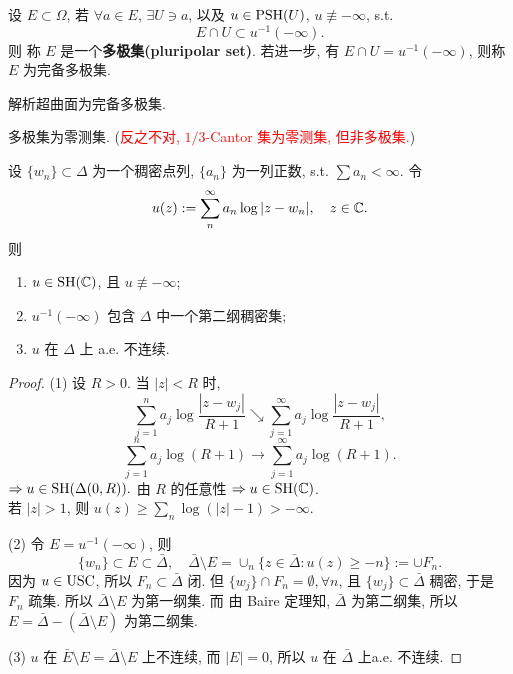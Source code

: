 \begin{definition}
  设 $E \subset \Omega $, 若 $\forall a \in E$, $\exists U \ni a$, 以及 $u \in \operatorname{PSH}(U)$, $u \not \equiv - \infty $, s.t. 
  $$ E \cap U \subset  u^{-1}(-\infty ).$$
  则 称 $E$ 是一个\textbf{多极集(pluripolar set)}. 
  若进一步, 有 $E \cap U=u^{-1}(-\infty )$, 则称 $E$ 为完备多极集.       
\end{definition}

\begin{example}
  解析超曲面为完备多极集.
\end{example}

\begin{corollary}
  多极集为零测集. (\textcolor{red}{反之不对, $1/3$-Cantor 集为零测集, 但非多极集.})
\end{corollary}

\begin{example}
  设 $\{w_n\} \subset \Delta $ 为一个稠密点列, $\{a_n\}$ 为一列正数, s.t. $\sum a_n <\infty $. 令 
  $$ u(z):=\sum_{n}^{\infty } a_n \log |z-w_n|, \quad z \in {\mathbb C}. $$  
  则 
  \begin{enumerate}[(1)]
    \item $u \in \operatorname{SH} ({\mathbb C})$, 且 $u \not \equiv  - \infty $;
    \item   $u^{-1}(-\infty )$ 包含 $\Delta $ 中一个第二纲稠密集;
    \item $u$ 在 $\Delta $ 上 a.e. 不连续.    
  \end{enumerate}
   \begin{proof}
    (1) 设 $R >0$. 当 $|z|<R$ 时,   
    $$ \sum_{j=1}^{n} a_j \log \frac{\left| z-w_j \right| }{R+1} \searrow \sum_{j=1}^{\infty } a_j \log \frac{\left| z-w_j \right|}{R+1} , $$    
    $$ \sum_{j=1}^{n}a_j \log(R+1) \to \sum_{j=1}^{\infty }a_j \log(R+1). $$
   $\Rightarrow u \in \operatorname{SH} (\Delta (0,R)). $  
   由 $R$  的任意性 $\Rightarrow u \in \operatorname{SH}({\mathbb C})$. \\
   若 $\left| z \right| >1 $, 则 $u(z) \geq \sum_{n}^{} \log (\left| z \right| -1 ) >- \infty $.  

   (2) 令 $E=u^{-1}(-\infty )$, 则 
   $$ \{w_n\} \subset E \subset \bar{\Delta }, \quad \bar{\Delta } \setminus E = \cup _{n} \{z \in \bar{\Delta }:u(z) \geq -n\}:= \cup F_n .$$
   因为 $u \in \operatorname{USC}$, 所以 $F_n \subset \bar{\Delta }$ 闭.   
   但 $\{w_j\} \cap F_n =\emptyset , \forall n$, 且 $\{w_j\} \subset \bar{\Delta }$ 稠密, 于是 $F_n$ 疏集. 所以 $\bar{\Delta } \setminus E$ 为第一纲集. 而 由 Baire 定理知, $\bar{\Delta }$ 为第二纲集, 所以 $E=\bar{\Delta }-(\bar{\Delta } \setminus E)$ 为第二纲集. 
   
   (3) $u$ 在 $\bar{E} \setminus E =\bar{\Delta } \setminus E$ 上不连续, 而 $\left| E \right| =0$, 所以 $u$ 在 $\bar{\Delta }$ 上a.e. 不连续.     
   \end{proof}
\end{example}

